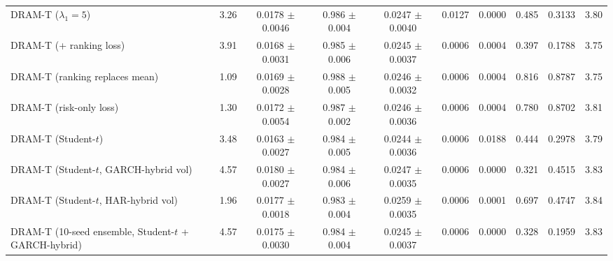 \begin{table}
\begin{tabular}{lccccccccc}
DRAM-T ($\lambda_1=5$) & 3.26 & 0.0178 $\pm$ 0.0046 & 0.986 $\pm$ 0.004 & 0.0247 $\pm$ 0.0040 & 0.0127 & 0.0000 & 0.485 & 0.3133 & 3.80 \\
DRAM-T (+ ranking loss) & 3.91 & 0.0168 $\pm$ 0.0031 & 0.985 $\pm$ 0.006 & 0.0245 $\pm$ 0.0037 & 0.0006 & 0.0004 & 0.397 & 0.1788 & 3.75 \\
DRAM-T (ranking replaces mean) & 1.09 & 0.0169 $\pm$ 0.0028 & 0.988 $\pm$ 0.005 & 0.0246 $\pm$ 0.0032 & 0.0006 & 0.0004 & 0.816 & 0.8787 & 3.75 \\
DRAM-T (risk-only loss) & 1.30 & 0.0172 $\pm$ 0.0054 & 0.987 $\pm$ 0.002 & 0.0246 $\pm$ 0.0036 & 0.0006 & 0.0004 & 0.780 & 0.8702 & 3.81 \\
DRAM-T (Student-$t$) & 3.48 & 0.0163 $\pm$ 0.0027 & 0.984 $\pm$ 0.005 & 0.0244 $\pm$ 0.0036 & 0.0006 & 0.0188 & 0.444 & 0.2978 & 3.79 \\
DRAM-T (Student-$t$, GARCH-hybrid vol) & 4.57 & 0.0180 $\pm$ 0.0027 & 0.984 $\pm$ 0.006 & 0.0247 $\pm$ 0.0035 & 0.0006 & 0.0000 & 0.321 & 0.4515 & 3.83 \\
DRAM-T (Student-$t$, HAR-hybrid vol) & 1.96 & 0.0177 $\pm$ 0.0018 & 0.983 $\pm$ 0.004 & 0.0259 $\pm$ 0.0035 & 0.0006 & 0.0001 & 0.697 & 0.4747 & 3.84 \\
DRAM-T (10-seed ensemble, Student-$t$ + GARCH-hybrid) & 4.57 & 0.0175 $\pm$ 0.0030 & 0.984 $\pm$ 0.004 & 0.0245 $\pm$ 0.0037 & 0.0006 & 0.0000 & 0.328 & 0.1959 & 3.83 \\
\bottomrule
\end{tabular}
\end{table}
